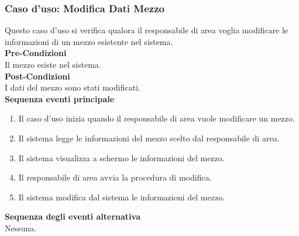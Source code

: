 \documentclass[green, fancy, 11pt]{elegantbook}
\begin{document}
\subsubsection{Caso d'uso: Modifica Dati Mezzo}
\noindent
Questo caso d’uso si verifica qualora il responsabile di area voglia modificare le informazioni di un mezzo esistente nel sistema.\\
\textbf{Pre-Condizioni}\\
Il  mezzo esiste nel sistema.\\
\textbf{Post-Condizioni}\\
I dati del mezzo sono stati modificati.\\
\textbf{Sequenza eventi principale}
\begin{enumerate}
	\item Il caso d’uso inizia quando il responsabile di area vuole modificare un mezzo.
	\item Il sistema legge le informazioni del mezzo scelto dal responsabile di area.
	\item Il sistema visualizza a schermo le informazioni del mezzo.
	\item Il responsabile di area avvia la procedura di modifica.
	\item Il sistema modifica dal sistema le informazioni del mezzo.
\end{enumerate}
\textbf{Sequenza degli eventi alternativa}\\
Nessuna.
\end{document}
